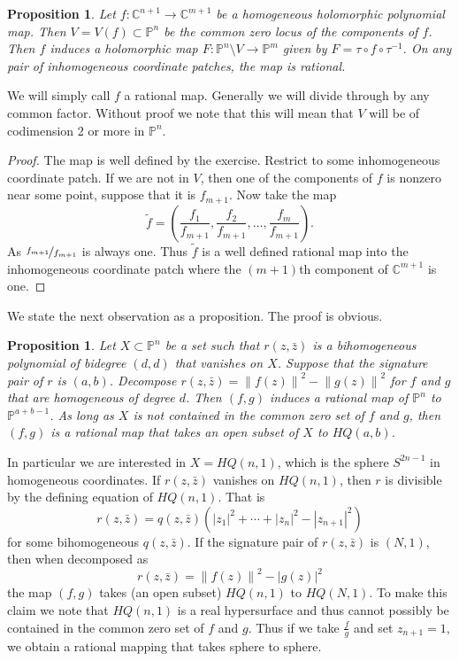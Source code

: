 \documentclass[12pt,openany]{book}
\newcommand{\abs}[1]{\left\lvert {#1} \right\rvert}
\newcommand{\norm}[1]{\left\lVert {#1} \right\rVert}
\newcommand{\C}{{\mathbb{C}}}
\newcommand{\bP}{{\mathbb{P}}}
\theoremstyle{plain}
\newtheorem{prop}[thm]{Proposition}
\theoremstyle{remark}
\theoremstyle{definition}
\theoremstyle{exercise}
\theoremstyle{example}
\begin{document}
\begin{prop}
Let  $f \colon \C^{n+1} \to \C^{m+1}$ be a homogeneous holomorphic polynomial
map.  Then $V = V(f) \subset \bP^n$ be the common zero locus of the components
of $f$.  Then $f$ induces a holomorphic map $F \colon \bP^n \setminus V \to
\bP^m$ given by
$F = \tau \circ f \circ \tau^{-1}$.  On any pair of inhomogeneous coordinate
patches, the map is rational.
\end{prop}

We will simply call $f$ a rational map.  Generally we will divide through by
any common factor.  Without proof we note that this will mean that $V$ will be
of codimension 2 or more in $\bP^n$.

\begin{proof}
The map is well defined by the exercise.  Restrict to
some inhomogeneous coordinate patch.  If we are not in $V$,
then one of the components of $f$ is nonzero near some point, suppose that it is
$f_{m+1}$.  Now take the map
\begin{equation}
\tilde{f} = 
\left(
\frac{f_1}{f_{m+1}} ,
\frac{f_2}{f_{m+1}} ,
\ldots,
\frac{f_m}{f_{m+1}} 
\right) .
\end{equation}
As
$\nicefrac{f_{m+1}}{f_{m+1}}$ is always one.  Thus $\tilde{f}$ is a well
defined rational map into the inhomogeneous coordinate patch where the
$(m+1)$th component of $\C^{m+1}$ is one.
\end{proof}

We state the next observation as a proposition.  The proof is obvious.

\begin{prop}
Let $X \subset \bP^n$ be a set such that $r(z,\bar{z})$ is a bihomogeneous
polynomial of bidegree $(d,d)$ that vanishes on $X$.  Suppose that the signature pair of $r$
is $(a,b)$.  Decompose $r(z,\bar{z}) = \norm{f(z)}^2 - \norm{g(z)}^2$
for $f$ and $g$ that are homogeneous of degree $d$.  Then $(f,g)$ induces
a rational map of $\bP^n$ to $\bP^{a+b-1}$.  As long as $X$ is not contained
in the common zero set of $f$ and $g$, then $(f,g)$ is a rational
map that takes an open subset of $X$ to $HQ(a,b)$.
\end{prop}

In particular we are interested in $X = HQ(n,1)$, which is the sphere
$S^{2n-1}$ in homogeneous coordinates.  If $r(z,\bar{z})$ vanishes
on $HQ(n,1)$, then $r$ is divisible by the defining equation of $HQ(n,1)$.
That is
\begin{equation}
r(z,\bar{z}) = q(z,\bar{z})
\left( \abs{z_1}^2 + \cdots + \abs{z_n}^2 - \abs{z_{n+1}}^2 \right)
\end{equation}
for some bihomogeneous $q(z,\bar{z})$.  If the signature pair of
$r(z,\bar{z})$ is $(N,1)$, then when decomposed as
\begin{equation}
r(z,\bar{z}) = 
\norm{f(z)}^2 - \abs{g(z)}^2
\end{equation}
the map $(f,g)$ takes (an open subset) $HQ(n,1)$ to $HQ(N,1)$.  To
make this claim we note that $HQ(n,1)$ is a real hypersurface and thus cannot
possibly be contained in the common zero set of $f$ and $g$.
Thus if we take $\frac{f}{g}$ and set $z_{n+1} = 1$, we obtain a rational
mapping that takes sphere to sphere.
\end{document}
